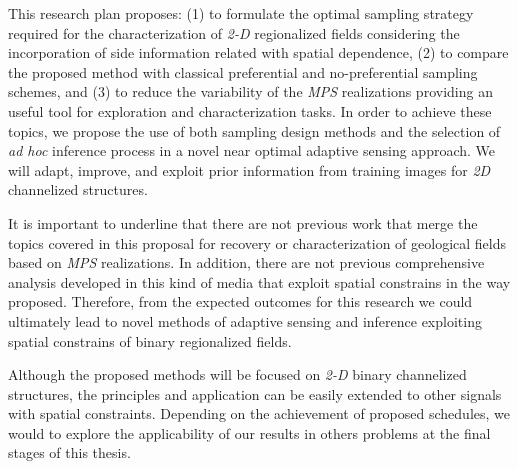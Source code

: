 \begin{conclusion}

This research plan proposes: (1) to formulate the optimal sampling strategy required for the characterization of \emph{2-D} regionalized fields considering the incorporation of side information related with spatial dependence, (2) to compare the proposed method with classical preferential and no-preferential sampling schemes, and (3) to reduce the variability of the \emph{MPS} realizations providing an useful tool for exploration and characterization tasks. In order to achieve these topics, we propose the use of both sampling design methods and the selection of \emph{ad hoc} inference process in a novel near optimal adaptive sensing approach. We will adapt, improve, and exploit prior information from training images for \emph{2D} channelized structures.

It is important to underline that there are not previous work that merge the topics covered in this proposal for  recovery or characterization of geological fields based on \emph{MPS} realizations. In addition, there are not previous comprehensive analysis developed in this kind of media that exploit spatial constrains in the way proposed. Therefore, from the expected outcomes for this research we could ultimately lead to novel methods of adaptive sensing and inference exploiting spatial constrains of binary regionalized fields. 

Although the proposed methods will be focused on \emph{2-D} binary channelized structures, the principles and application can be easily extended to other signals with spatial constraints. Depending on the achievement of proposed schedules, we would to explore the applicability of our results in others problems at the final stages of this thesis.



\end{conclusion}
